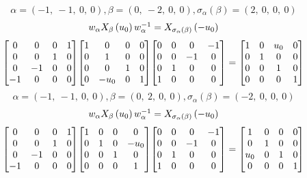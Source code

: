 \documentclass[11pt]{article}
\theoremstyle{definition}
\begin{document}
\[
\alpha = \left( -1, \  -1, \  0, \  0\right), \beta = \left( 0, \  -2, \  0, \  0\right), \sigma_{\alpha}(\beta) = \left( 2, \  0, \  0, \  0\right)
\]
\[
\scaletoalign{\textwidth}{w_{\alpha} X_{\beta}\left(u_{0}\right) w_{\alpha}^{-1} = X_{\sigma_{\alpha}\left(\beta\right)}\left(- u_{0}\right)}
\]
\[
\scaletoalign{\textwidth}{{\left[\begin{matrix}0 & 0 & 0 & 1\\0 & 0 & 1 & 0\\0 & -1 & 0 & 0\\-1 & 0 & 0 & 0\end{matrix}\right]} {\left[\begin{matrix}1 & 0 & 0 & 0\\0 & 1 & 0 & 0\\0 & 0 & 1 & 0\\0 & - u_{0} & 0 & 1\end{matrix}\right]} {\left[\begin{matrix}0 & 0 & 0 & -1\\0 & 0 & -1 & 0\\0 & 1 & 0 & 0\\1 & 0 & 0 & 0\end{matrix}\right]} = {\left[\begin{matrix}1 & 0 & u_{0} & 0\\0 & 1 & 0 & 0\\0 & 0 & 1 & 0\\0 & 0 & 0 & 1\end{matrix}\right]}}
\]
\[
\alpha = \left( -1, \  -1, \  0, \  0\right), \beta = \left( 0, \  2, \  0, \  0\right), \sigma_{\alpha}(\beta) = \left( -2, \  0, \  0, \  0\right)
\]
\[
\scaletoalign{\textwidth}{w_{\alpha} X_{\beta}\left(u_{0}\right) w_{\alpha}^{-1} = X_{\sigma_{\alpha}\left(\beta\right)}\left(- u_{0}\right)}
\]
\[
\scaletoalign{\textwidth}{{\left[\begin{matrix}0 & 0 & 0 & 1\\0 & 0 & 1 & 0\\0 & -1 & 0 & 0\\-1 & 0 & 0 & 0\end{matrix}\right]} {\left[\begin{matrix}1 & 0 & 0 & 0\\0 & 1 & 0 & - u_{0}\\0 & 0 & 1 & 0\\0 & 0 & 0 & 1\end{matrix}\right]} {\left[\begin{matrix}0 & 0 & 0 & -1\\0 & 0 & -1 & 0\\0 & 1 & 0 & 0\\1 & 0 & 0 & 0\end{matrix}\right]} = {\left[\begin{matrix}1 & 0 & 0 & 0\\0 & 1 & 0 & 0\\u_{0} & 0 & 1 & 0\\0 & 0 & 0 & 1\end{matrix}\right]}}
\]
\end{document}

